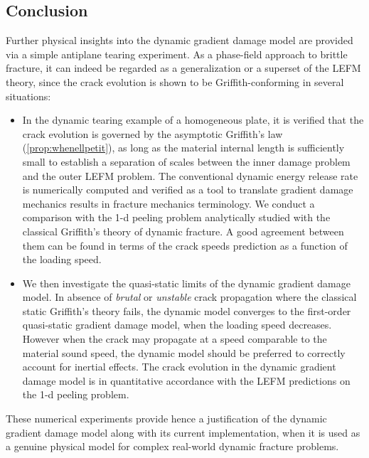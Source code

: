 \subsection*{Conclusion}
Further physical insights into the dynamic gradient damage model are provided via a simple antiplane tearing experiment. As a phase-field approach to brittle fracture, it can indeed be regarded as a generalization or a superset of the LEFM theory, since the crack evolution is shown to be Griffith-conforming in several situations:
\begin{itemize}
\item In the dynamic tearing example of a homogeneous plate, it is verified that the crack evolution is governed by the asymptotic Griffith's law (\cref{prop:whenellpetit}), as long as the material internal length is sufficiently small to establish a separation of scales between the inner damage problem and the outer LEFM problem. The conventional dynamic energy release rate is numerically computed and verified as a tool to translate gradient damage mechanics results in fracture mechanics terminology. We conduct a comparison with the 1-d peeling problem \cite{DumouchelMarigoCharlotte:2008} analytically studied with the classical Griffith's theory of dynamic fracture. A good agreement between them can be found in terms of the crack speeds prediction as a function of the loading speed.

\item We then investigate the quasi-static limits of the dynamic gradient damage model. In absence of \emph{brutal} or \emph{unstable} crack propagation where the classical static Griffith's theory fails, the dynamic model converges to the first-order quasi-static gradient damage model, when the loading speed decreases. However when the crack may propagate at a speed comparable to the material sound speed, the dynamic model should be preferred to correctly account for inertial effects. The crack evolution in the dynamic gradient damage model is in quantitative accordance with the LEFM predictions on the 1-d peeling problem.
\end{itemize}

These numerical experiments provide hence a justification of the dynamic gradient damage model along with its current implementation, when it is used as a genuine physical model for complex real-world dynamic fracture problems.

